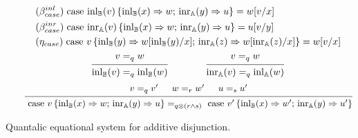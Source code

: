 \documentclass[a4paper,UKenglish,cleveref, autoref, thm-restate]{lipics-v2021}
\begin{document}
  \begin{figure}[h!]
    \begin{equation*}
            \hspace{30pt}
        \begin{split}
          &(\beta_{case}^{inl}) \hspace{3pt} \text{case } 
          \mathrm{inl}_{\mathbb{B}}(v)\, \{ \mathrm{inl}_{\mathbb{B}} (x) \Rightarrow w 
          ;\, \mathrm{inr}_{\mathbb{A}} (y) 
          \Rightarrow u\}= w[v/x]
          \\
          &(\beta_{case}^{inr}) \hspace{3pt} \text{case } 
          \mathrm{inr}_{\mathbb{A}}(v)\, \{ \mathrm{inl}_{\mathbb{B}} (x) \Rightarrow w 
          ;\, \mathrm{inr}_{\mathbb{A}} (y) 
          \Rightarrow u\}= u[v/y]
          \\
          & (\eta_{case}) \hspace{3pt} \text{case } v\, \{\text{inl}_{\mathbb{B}} (y) \Rightarrow w [ \text{inl}_{\mathbb{B}}(y)/x] ;\, \text{inr}_{\mathbb{A}} (z) \Rightarrow w [ \text{inr}_{\mathbb{A}}(z)/x]\} = w[v/x] 
        \end{split}
    \end{equation*}
    \noindent\dotfill{}
    \begin{equation*}
            \hspace{75pt}
            \begin{prooftree}
                    \hypo{ v =_q w}
                    \infer1[]{\inl_\typeB(v) =_q \inl_\typeB(w)}
            \end{prooftree}
            \hspace{40pt}
            \begin{prooftree}
                    \hypo{ v =_q w}
                    \infer1[]{\inr_\typeA(v) =_q \inl_\typeA(w)}
            \end{prooftree}
    \end{equation*}
    \begin{equation*}
    \hspace{20pt}
   \begin{prooftree}
      \hypo{ v =_{q} v' }
      \hypo{w=_{r} w'}
      \hypo{u=_{s}u'}
      \infer3[]{\text{ case } v \,   \{\inl_\typeB (x) \Rightarrow w ; \, \inr_\typeA (y) 
              \Rightarrow u\} 
      =_{q\otimes(r \wedge s)} 
      \text{ case } v' 
      \,  \{\inl_\typeB (x) \Rightarrow w' ; \,\inr_\typeA (y) \Rightarrow u'\} }
  \end{prooftree}
    \end{equation*}
    \caption{Quantalic equational system for additive disjunction.}
    \label{fig:equations-in-context-cond}
    \end{figure}
\end{document}
